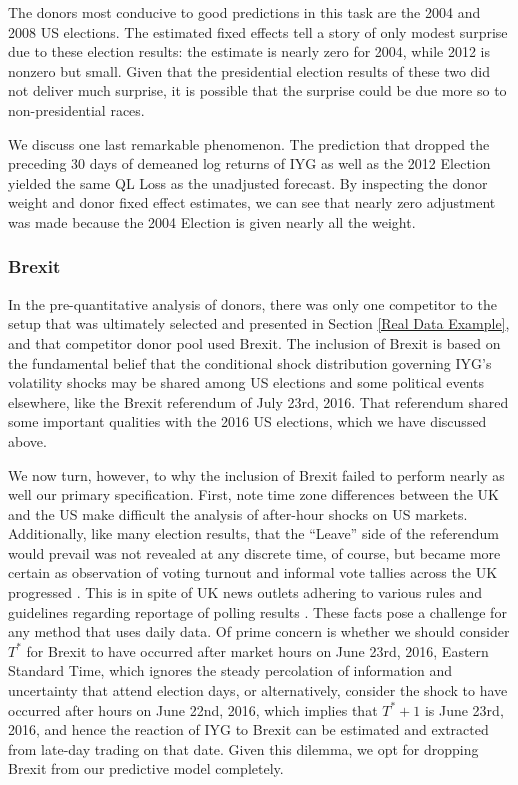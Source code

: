 \documentclass[11pt,3p,review,authoryear]{elsarticle}
\theoremstyle{definition}
\begin{document}
The donors most conducive to good predictions in this task are the 2004 and 2008 US elections.  The estimated fixed effects tell a story of only modest surprise due to these election results: the estimate is nearly zero for 2004, while 2012 is nonzero but small.  Given that the presidential election results of these two did not deliver much surprise, it is possible that the surprise could be due more so to non-presidential races.

We discuss one last remarkable phenomenon.  The prediction that dropped the preceding 30 days of demeaned log returns of IYG as well as the 2012 Election yielded the same QL Loss as the unadjusted forecast.  By inspecting the donor weight and donor fixed effect estimates, we can see that nearly zero adjustment was made because the 2004 Election is given nearly all the weight.

\subsubsection{Brexit}
In the pre-quantitative analysis of donors, there was only one competitor to the setup that was ultimately selected and presented in Section \ref{Real Data Example}, and that competitor donor pool used Brexit.  The inclusion of Brexit is based on the fundamental belief that the conditional shock distribution governing IYG's volatility shocks may be shared among US elections and some political events elsewhere, like the Brexit referendum of July 23rd, 2016.  That referendum shared some important qualities with the 2016 US elections, which we have discussed above.

We now turn, however, to why the inclusion of Brexit failed to perform nearly as well our primary specification.  First, note time zone differences between the UK and the US make difficult the analysis of after-hour shocks on US markets.  Additionally, like many election results, that the ``Leave'' side of the referendum would prevail was not revealed at any discrete time, of course, but became more certain as observation of voting turnout and informal vote tallies across the UK progressed \citep{BBC_News_2016}.  This is in spite of UK news outlets adhering to various rules and guidelines regarding reportage of polling results \citep{Bailey_2024}.  These facts pose a challenge for any method that uses daily data.  Of prime concern is whether we should consider $T^{*}$ for Brexit to have occurred after market hours on June 23rd, 2016, Eastern Standard Time, which ignores the steady percolation of information and uncertainty that attend election days, or alternatively, consider the shock to have occurred after hours on June 22nd, 2016, which implies that $T^{*}+1$ is June 23rd, 2016, and hence the reaction of IYG to Brexit can be estimated and extracted from late-day trading on that date.  Given this dilemma, we opt for dropping Brexit from our predictive model completely.
\end{document}
